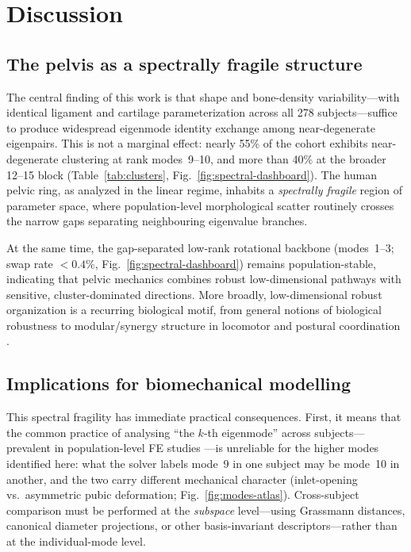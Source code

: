 \documentclass[11pt]{article}
\begin{document}
\section{Discussion}
\label{sec:discussion}

\subsection*{The pelvis as a spectrally fragile structure}
The central finding of this work is that shape and bone-density variability---with identical ligament and cartilage parameterization across all 278 subjects---suffice to produce widespread eigenmode identity exchange among near-degenerate eigenpairs.
This is not a marginal effect: nearly 55\% of the cohort exhibits near-degenerate clustering at rank modes~9--10, and more than 40\% at the broader 12--15 block (Table~\ref{tab:clusters}, Fig.~\ref{fig:spectral-dashboard}).
The human pelvic ring, as analyzed in the linear regime, inhabits a \emph{spectrally fragile} region of parameter space, where population-level morphological scatter routinely crosses the narrow gaps separating neighbouring eigenvalue branches.

At the same time, the gap-separated low-rank rotational backbone (modes~1--3; swap rate $<0.4\%$, Fig.~\ref{fig:spectral-dashboard}) remains population-stable, indicating that pelvic mechanics combines robust low-dimensional pathways with sensitive, cluster-dominated directions.
More broadly, low-dimensional robust organization is a recurring biological motif, from general notions of biological robustness \citep{Kitano2004} to modular/synergy structure in locomotor and postural coordination \citep{Gizzi2011,Ting2012}.

\subsection*{Implications for biomechanical modelling}
This spectral fragility has immediate practical consequences.
First, it means that the common practice of analysing ``the $k$-th eigenmode'' across subjects---prevalent in population-level FE studies \citep{Anderson2020,Yang2020,Song2021}---is unreliable for the higher modes identified here: what the solver labels mode~9 in one subject may be mode~10 in another, and the two carry different mechanical character (inlet-opening vs.\ asymmetric pubic deformation; Fig.~\ref{fig:modes-atlas}).
Cross-subject comparison must be performed at the \emph{subspace} level---using Grassmann distances, canonical diameter projections, or other basis-invariant descriptors---rather than at the individual-mode level.
\end{document}
